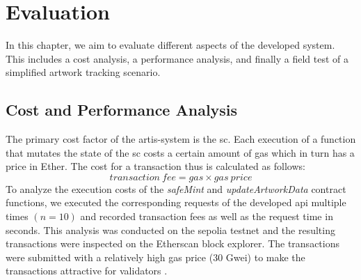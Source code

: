 \chapter{Evaluation}
\label{chap:evaluation}
In this chapter, we aim to evaluate different aspects of the developed system. This includes a cost analysis, a performance analysis, and finally a field test of a simplified artwork tracking scenario.

\section{Cost and Performance Analysis}
The primary cost factor of the artis-system is the \gls{sc}. Each execution of a function that mutates the state of the \gls{sc} costs a certain amount of gas which in turn has a price in Ether. The cost for a transaction thus is calculated as follows:
$$
transaction\ fee = gas \times gas\ price
$$
To analyze the execution costs of the \textit{safeMint} and \textit{updateArtworkData} contract functions, we executed the corresponding requests of the developed \gls{api} multiple times $(n = 10)$ and recorded transaction fees as well as the request time in seconds. This analysis was conducted on the sepolia testnet and the resulting transactions were inspected on the Etherscan block explorer. The transactions were submitted with a relatively high gas price (30 Gwei) to make the transactions attractive for validators \cite{ethergas}.

